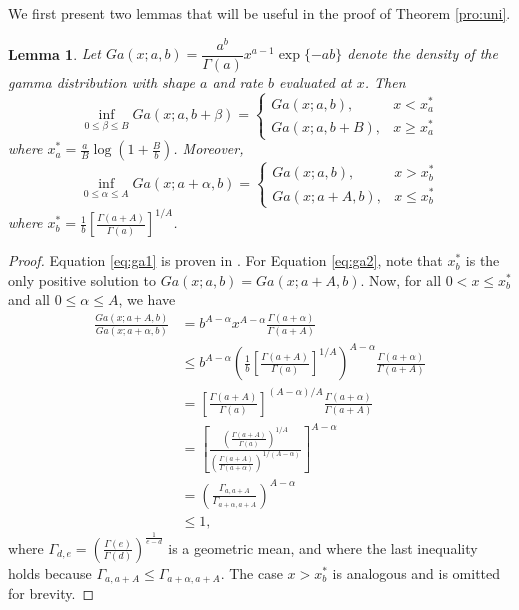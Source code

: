 \documentclass[12pt]{article}
\newtheorem{lemma}{Lemma}[section]
\begin{document}
	We first present two lemmas that will be useful in the proof of Theorem \ref{pro:uni}.
	\begin{lemma}
		\label{pro:ga1}
		Let $Ga(x;a,b) = \dfrac{a^b}{\Gamma(a)}x^{a-1}\exp\{-ab\}$ denote the density of the gamma distribution with shape $a$ and rate $b$ evaluated at $x$. Then
		\begin{equation}
			\label{eq:ga1}
			\inf_{0\le \beta\le B} Ga(x;a,b+\beta) = 
			\begin{cases}
				Ga(x;a,b), & x<x_a^* \\ Ga(x;a,b+B), & x\ge x_a^*
			\end{cases}
		\end{equation}	
		where $x_a^*=\frac{a}{B}\log\left( 1+\frac{B}{b}\right) $. Moreover,
		\begin{equation}
			\label{eq:ga2}
			\inf_{0\le \alpha\le A} Ga(x;a+\alpha,b) = 
			\begin{cases}
				Ga(x;a,b), & x>x_b^* \\ Ga(x;a+A,b), & x\le x_b^*
			\end{cases}
		\end{equation}
		where $x_b^*=\frac{1}{b}\left[ \frac{\Gamma(a+A)}{\Gamma(a)}\right]^{1/A}$. 
	\end{lemma}
	\begin{proof}
		Equation \eqref{eq:ga1} is proven in \cite{Jones.2004}. For Equation \eqref{eq:ga2}, note that $x_b^*$ is the only positive solution to $Ga(x;a,b) = Ga(x;a+A,b)$. Now, for all $0<x\le x_b^*$ and all $0\le\alpha\le A$, we have
		\begin{align*}
			\frac{Ga(x;a+A,b)}{Ga(x;a+\alpha,b)}
			& = b^{A-\alpha}x^{A-\alpha} \frac{\Gamma(a+\alpha)}{\Gamma(a+A)} \\
			& \le b^{A-\alpha}\left(\frac{1}{b}\left[ \frac{\Gamma(a+A)}{\Gamma(a)}\right]^{1/A} \right)^{A-\alpha} \frac{\Gamma(a+\alpha)}{\Gamma(a+A)} \\
			& = \left[ \frac{\Gamma(a+A)}{\Gamma(a)}\right]^{(A-\alpha)/A} \frac{\Gamma(a+\alpha)}{\Gamma(a+A)} \\
			& = \left[
			\frac{\left(\frac{\Gamma(a+A)}{\Gamma(a)}\right)^{1/A}}{\left(\frac{\Gamma(a+A)}{\Gamma(a+\alpha)}\right)^{1/(A-\alpha)}}
			\right]^{A-\alpha} \\
			& = \left( \frac{\Gamma_{a,a+A}}{\Gamma_{a+\alpha, a+A}}\right)^{A-\alpha} \\
			& \le 1,
		\end{align*}
		where $\Gamma_{d,e} = \left( \frac{\Gamma(e)}{\Gamma(d)} \right)^{\frac{1}{e-d}}$ is a geometric mean,
		and where the last inequality holds because $\Gamma_{a,a+A}\le\Gamma_{a+\alpha, a+A}$.
		The case $x>x_b^*$ is analogous and is omitted for brevity.
	\end{proof}
	
\end{document}
